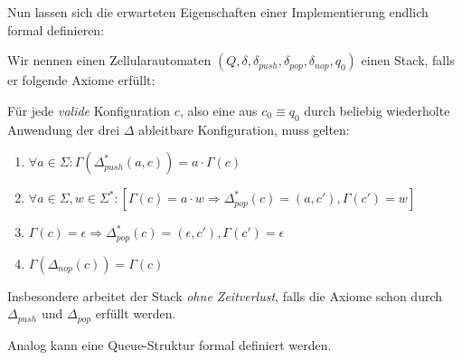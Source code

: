 \documentclass{article}
\begin{document}
Nun lassen sich die erwarteten Eigenschaften einer Implementierung endlich formal definieren:
\begin{definition}
    Wir nennen einen Zellularautomaten $(Q, \delta, \delta_{push}, \delta_{pop}, \delta_{nop}, q_0)$ einen Stack, falls er folgende Axiome erfüllt:

    Für jede \emph{valide} Konfiguration $c$, also eine aus $c_0 \equiv q_0$ durch beliebig wiederholte Anwendung der drei $\Delta$ ableitbare Konfiguration, muss gelten:
    \begin{enumerate}
        \item $\forall a \in \Sigma: \Gamma(\Delta^*_{push}(a,c)) = a \cdot \Gamma(c)$
        \item $\forall a \in \Sigma, w \in \Sigma^*: \left[ \Gamma(c) = a \cdot w \Rightarrow \Delta^*_{pop}(c) = (a,c'), \Gamma(c') = w \right]$
        \item $\Gamma(c) = \epsilon \Rightarrow \Delta^*_{pop}(c) = (\epsilon,c'), \Gamma(c') = \epsilon$
        \item $\Gamma(\Delta_{nop}(c)) = \Gamma(c)$
    \end{enumerate}
    Insbesondere arbeitet der Stack \emph{ohne Zeitverlust}, falls die Axiome schon durch $\Delta_{push}$ und $\Delta_{pop}$ erfüllt werden.
\end{definition}

Analog kann eine Queue-Struktur formal definiert werden.
\end{document}
